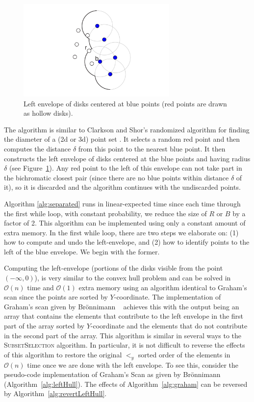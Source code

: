 \documentclass{elsart}
\newcommand{\Oh}[1]{\ensuremath{\mathcal{O}(#1)}}
\begin{document}
\begin{figure}
  \centerline{\includegraphics[height=5cm]{biclosest_algorithm}}
  \caption{Left envelope of disks centered at blue points (red
    points are drawn as hollow disks).}
  \label{fig:biclosest_algorithm}
  \label{fig:left-envelope}
\end{figure}

The algorithm is similar to Clarkson and Shor's randomized algorithm
for finding the diameter of a (2d or 3d) point set
\cite{clarkson:random}.  It selects a random red point and then
computes the distance $\delta$ from this point to the nearest blue
point.  It then constructs the left envelope of disks centered at the
blue points and having radius $\delta$ (see
Figure~\ref{fig:left-envelope}).  Any red point to the left of this
envelope can not take part in the bichromatic closest pair (since
there are no blue points within distance $\delta$ of it), so it is
discarded and the algorithm continues with the undiscarded points.

Algorithm \ref{alg:separated} runs in linear-expected time since each
time through the first while loop, with constant probability, we
reduce the size of $R$ or $B$ by a factor of 2.  This algorithm can be
implemented using only a constant amount of extra memory.  In the
first while loop, there are two steps we elaborate on: (1) how to
compute and undo the left-envelope, and (2) how to identify points to
the left of the blue envelope. We begin with the former.

Computing the left-envelope (portions of the disks visible from the
point $(-\infty, 0)$), is very similar to the convex hull problem and
can be solved in \Oh{n} time and \Oh{1} extra memory using an
algorithm identical to Graham's scan since the points are sorted by
$Y$-coordinate.  The implementation of Graham's scan given by
Br\"onnimann \etal~\cite{bronnimann:convex} achieves this with the
output being an array that contains the elements that contribute to
the left envelope in the first part of the array sorted by
$Y$-coordinate and the elements that do not contribute in the second
part of the array. This algorithm is similar in several ways to the
\textsc{SubsetSelection} algorithm.  In particular, it is not
difficult to reverse the effects of this algorithm to restore the
original $<_y$ sorted order of the elements in \Oh{n} time once we are
done with the left envelope. To see this, consider the pseudo-code
implementation of Graham's Scan as given by Br\"onnimann \etal\
\cite{bronnimann:convex} (Algorithm~\ref{alg:leftHull}).  The effects
of Algorithm~\ref{alg:graham} can be reversed by
Algorithm~\ref{alg:revertLeftHull}.
\end{document}
